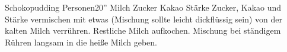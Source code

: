 \begin{MyRecipe}{Schokopudding}{ Personen}{20''}
	\ingredient[\Calc{0.5}{\x}]{\si{\liter}} {Milch}
	\ingredient[\Calc{60}{\x}]{\si{\gram}} {Zucker}
	\ingredient[\Calc{50}{\x}]{\si{\gram}} {Kakao}
	\ingredient[\Calc{35}{\x}]{\si{\gram}} {Stärke}
	Zucker, Kakao und Stärke vermischen mit etwas (Mischung sollte leicht dickflüssig sein) von der kalten Milch verrühren. Restliche Milch aufkochen. Mischung bei ständigem Rühren langsam in die heiße Milch geben.\par\bigskip
\end{MyRecipe}